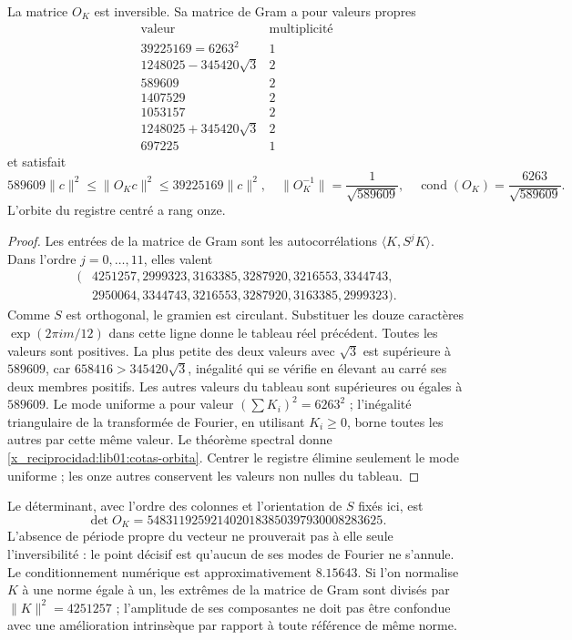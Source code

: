 \begin{theorem}
\label{x_reciprocidad:lib01:marco-ciclico}
La matrice \(O_K\) est inversible. Sa matrice de Gram a pour valeurs propres
\[
\begin{array}{c|c}
 \text{valeur}&\text{multiplicité}\\\hline
 39225169=6263^2&1\\
 1248025-345420\sqrt3&2\\
 589609&2\\
 1407529&2\\
 1053157&2\\
 1248025+345420\sqrt3&2\\
 697225&1
\end{array}
\]
et satisfait
\begin{equation}
 589609\|c\|^2\leq\|O_Kc\|^2\leq39225169\|c\|^2,
 \quad
 \|O_K^{-1}\|=\frac1{\sqrt{589609}},\quad
 \operatorname{cond}(O_K)=\frac{6263}{\sqrt{589609}}.
 \label{x_reciprocidad:lib01:cotas-orbita}
\end{equation}
L’orbite du registre centré a rang onze.
\end{theorem}
\begin{proof}
Les entrées de la matrice de Gram sont les autocorrélations \(\langle K,S^jK\rangle\). Dans l'ordre \(j=0,\ldots,11\), elles valent
\begin{align*}
 (&4251257,2999323,3163385,3287920,3216553,3344743,\\
  &2950064,3344743,3216553,3287920,3163385,2999323).
\end{align*}
Comme \(S\) est orthogonal, le gramien est circulant. Substituer les douze
caractères \(\exp(2\pi i m/12)\) dans cette ligne donne le tableau réel
précédent. Toutes les valeurs sont positives. La plus petite des deux valeurs
avec \(\sqrt3\) est supérieure à \(589609\), car
\(658416>345420\sqrt3\), inégalité qui se vérifie en élevant au
carré ses deux membres positifs. Les autres valeurs du tableau sont
supérieures ou égales à \(589609\). Le mode uniforme a pour valeur
\((\sum K_i)^2=6263^2\) ; l’inégalité triangulaire de la transformée
de Fourier, en utilisant \(K_i\geq0\), borne toutes les autres par cette même
valeur. Le théorème spectral donne \eqref{x_reciprocidad:lib01:cotas-orbita}. Centrer
le registre élimine seulement le mode uniforme ; les onze autres conservent
les valeurs non nulles du tableau.
\end{proof}

Le déterminant, avec l’ordre des colonnes et l’orientation de \(S\)
fixés ici, est
\[
 \det O_K=5483119259214020183850397930008283625.
\]
L'absence de période propre du vecteur ne prouverait pas à elle seule l'inversibilité : le point décisif est qu'aucun de ses modes de Fourier ne s'annule. Le conditionnement numérique est approximativement \(8.15643\). Si l'on normalise \(K\) à une norme égale à un, les extrêmes de la matrice de Gram sont divisés par \(\|K\|^2=4251257\) ; l'amplitude de ses composantes ne doit pas être confondue avec une amélioration intrinsèque par rapport à toute référence de même norme.

